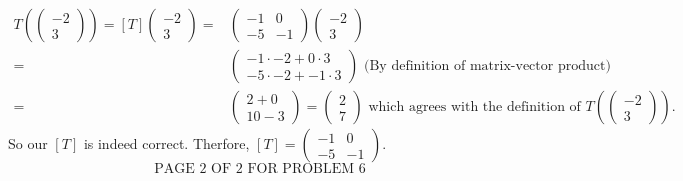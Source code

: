 \documentclass[12pt]{article}
\newenvironment{problem}[2][Problem]
{
	\begin{trivlist} 
		\item[\hskip \labelsep {\bfseries #1 #2:}]
	}
{
	\end{trivlist}
	}
\begin{document}
\begin{problem}{6}
\begin{align*}
T\left(\begin{pmatrix}-2\\3\end{pmatrix}\right) = [T]\begin{pmatrix}-2\\3\end{pmatrix} =& \begin{pmatrix} -1 & 0\\ -5 & -1 \end{pmatrix}\begin{pmatrix}-2\\3\end{pmatrix} &\\
=& \begin{pmatrix} -1\cdot -2 + 0 \cdot 3\\ -5\cdot -2 + -1\cdot 3 \end{pmatrix}\text{ (By definition of matrix-vector product)} & \\
=& \begin{pmatrix} 2 + 0 \\ 10 -3 \end{pmatrix} = \begin{pmatrix} 2 \\ 7 \end{pmatrix} \text{ which agrees with the definition of $T\left(\begin{pmatrix}-2\\3\end{pmatrix}\right)$.} &
\end{align*}
So our $[T]$ is indeed correct. Therfore, $[T] = \begin{pmatrix} -1 & 0\\ -5 & -1 \end{pmatrix}$.
\noindent
\newline
\newline
\newline
\newline
\newline
\newline
\newline
\newline
\newline
\newline
\[
\text{PAGE 2 OF 2 FOR PROBLEM 6}
\]
\end{problem}
\end{document}
